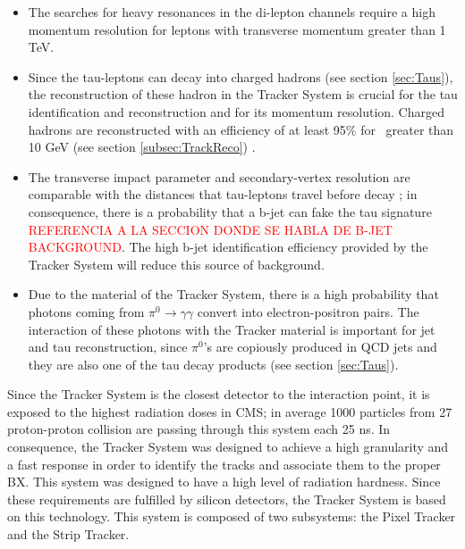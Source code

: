 \begin{itemize}
 \item The searches for heavy resonances in the di-lepton channels require a 
 high momentum resolution for leptons with transverse momentum greater than 1 TeV. 
 \item Since the tau-leptons can decay into charged hadrons (see section \ref{sec:Taus}), the 
 reconstruction of these hadron in the Tracker System is crucial
 for the tau identification and reconstruction and for its momentum resolution. Charged
 hadrons are reconstructed with an efficiency of at least 95$\%$ for \pt~greater than
 10 GeV (see section \ref{subsec:TrackReco}) \cite{TrackerPerformace}.
 \item The transverse impact parameter and secondary-vertex resolution are comparable with 
 the distances that tau-leptons travel before decay \cite{TauReconstructionCMSRun1}; 
 in consequence, there is a probability that a b-jet can fake 
 the tau signature \textcolor{red}{REFERENCIA A LA SECCION DONDE SE HABLA DE B-JET BACKGROUND}. The 
 high b-jet identification efficiency provided by the Tracker System will reduce this source of background.
 \item Due to the material of the Tracker System, there is a high probability 
 that photons coming from $\pi^{0} \rightarrow \gamma\gamma$ convert into electron-positron 
 pairs. The interaction of these photons with the Tracker material is important for jet and tau reconstruction,
 since $\pi^{0}$'s are copiously produced in QCD jets and they are also one of the tau decay 
 products (see section \ref{sec:Taus}).
 
\end{itemize}

Since the Tracker System is the closest detector to the interaction point, it is exposed 
to the highest radiation doses in CMS; in average 1000 particles from 27 proton-proton collision 
are passing through this system each 25 ns. In consequence, the Tracker System was designed to achieve a high granularity 
and a fast response in order to identify the tracks and associate them 
to the proper BX. This system was designed to have a high level of radiation hardness. Since 
these requirements are fulfilled by silicon detectors, the Tracker System is based on 
this technology. This system is composed of two subsystems: the Pixel Tracker and the Strip Tracker. \\ 

